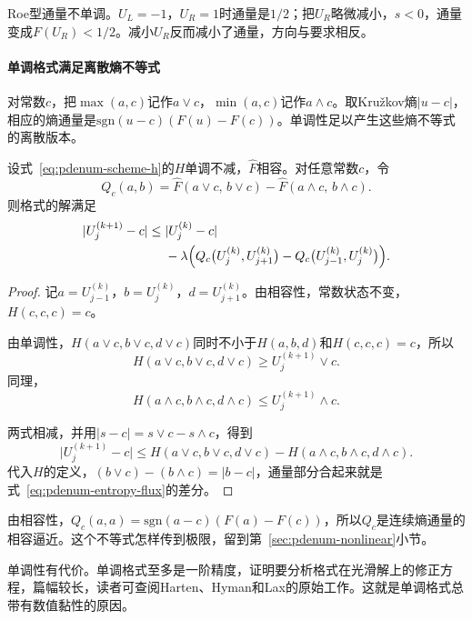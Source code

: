 Roe型通量不单调。$U_L=-1$，$U_R=1$时通量是$1/2$；把$U_R$略微减小，$s<0$，通量变成$F(U_R)<1/2$。减小$U_R$反而减小了通量，方向与要求相反。

\paragraph{单调格式满足离散熵不等式}
对常数$c$，把$\max(a,c)$记作$a\vee c$，$\min(a,c)$记作$a\wedge c$。取Kružkov熵$\lvert u-c\rvert$，相应的熵通量是$\mathrm{sgn}(u-c)(F(u)-F(c))$。单调性足以产生这些熵不等式的离散版本。

\begin{theorem}[离散熵不等式]
 \label{thm:pdenum-discrete-entropy}
 设式~\eqref{eq:pdenum-scheme-h}的$H$单调不减，$\widehat{F}$相容。对任意常数$c$，令
 \begin{equation}
  Q_c(a,b)=\widehat{F}(a\vee c,\,b\vee c)-\widehat{F}(a\wedge c,\,b\wedge c).
  \label{eq:pdenum-entropy-flux}
 \end{equation}
 则格式的解满足
 \begin{equation}
  \begin{aligned}
  \lvert U_j^{(k+1)}-c\rvert\leq{}&\lvert U_j^{(k)}-c\rvert\\
  &-\lambda\Bigl(Q_c\bigl(U_j^{(k)},U_{j+1}^{(k)}\bigr)-Q_c\bigl(U_{j-1}^{(k)},U_j^{(k)}\bigr)\Bigr).
  \end{aligned}
  \label{eq:pdenum-discrete-entropy}
 \end{equation}
\end{theorem}

\begin{proof}
 记$a=U_{j-1}^{(k)}$，$b=U_j^{(k)}$，$d=U_{j+1}^{(k)}$。由相容性，常数状态不变，$H(c,c,c)=c$。

 由单调性，$H(a\vee c,b\vee c,d\vee c)$同时不小于$H(a,b,d)$和$H(c,c,c)=c$，所以
 \[
  H(a\vee c,b\vee c,d\vee c)\geq U_j^{(k+1)}\vee c .
 \]
 同理，
 \[
  H(a\wedge c,b\wedge c,d\wedge c)\leq U_j^{(k+1)}\wedge c .
 \]

 两式相减，并用$\lvert s-c\rvert=s\vee c-s\wedge c$，得到
 \[
  \lvert U_j^{(k+1)}-c\rvert\leq H(a\vee c,b\vee c,d\vee c)-H(a\wedge c,b\wedge c,d\wedge c) .
 \]
 代入$H$的定义，$(b\vee c)-(b\wedge c)=\lvert b-c\rvert$，通量部分合起来就是式~\eqref{eq:pdenum-entropy-flux}的差分。
\end{proof}

由相容性，$Q_c(a,a)=\mathrm{sgn}(a-c)(F(a)-F(c))$，所以$Q_c$是连续熵通量的相容逼近。这个不等式怎样传到极限，留到第~\ref{sec:pdenum-nonlinear}小节。

单调性有代价。单调格式至多是一阶精度，证明要分析格式在光滑解上的修正方程，篇幅较长，读者可查阅Harten、Hyman和Lax的原始工作。这就是单调格式总带有数值黏性的原因。
